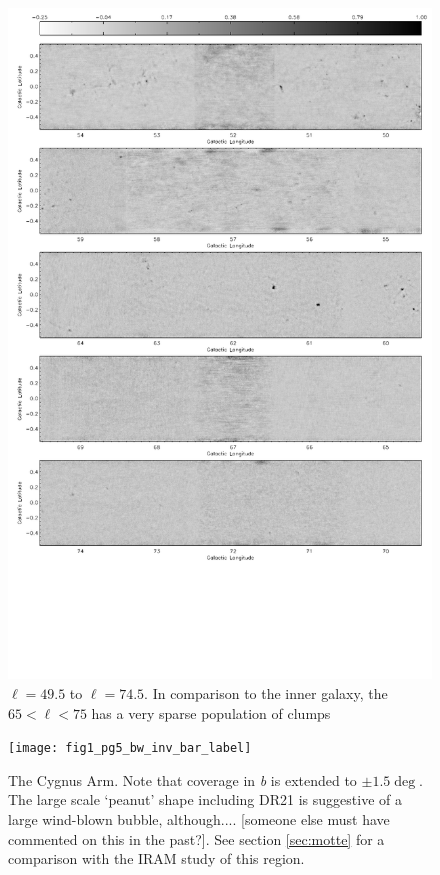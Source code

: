 \documentclass[12pt,preprint]{aastex}
\newcommand{\lon}{\ensuremath{\ell}}
\begin{document}
\begin{figure}
  \begin{minipage}{6.5in} 
    \begin{center}
      \includegraphics[scale=0.9]{fig1_pg3_bw_inv_bar_label}
      \caption{$\lon=49.5$ to $\lon=74.5$.  In comparison to the inner galaxy, the $65
      < \ell < 75$ has a very sparse population of clumps}
    \end{center}
  \end{minipage}
\end{figure}

\addtocounter{figure}{-1}
\addtocounter{subfig}{1}

\begin{figure}
  \hspace{-1in}
  \texttt{[image: fig1\_pg5\_bw\_inv\_bar\_label]} 
  \caption{The Cygnus Arm. Note that coverage in \emph{b} is extended to $\pm
  1.5\deg$. The large scale `peanut' shape including DR21 is suggestive of a
  large wind-blown bubble, although.... [someone else must have commented on
  this in the past?].  See section \ref{sec:motte} for a comparison with the
  \citet{motte07} IRAM study of this region. }
\end{figure}
\end{document}
